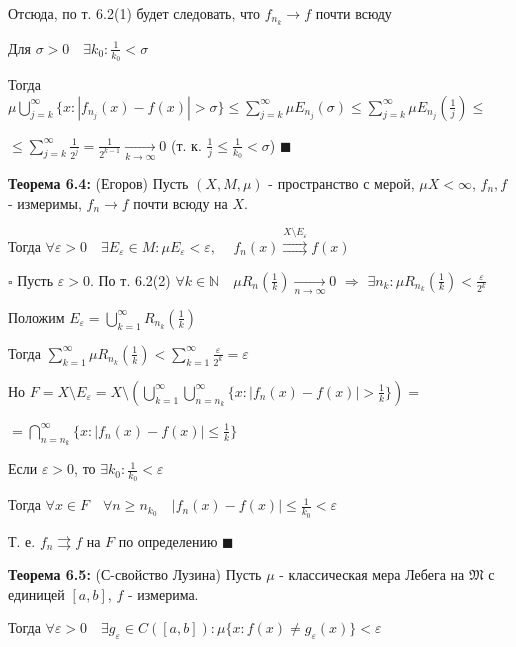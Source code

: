 \documentclass[a4paper]{report}
\begin{document}
Отсюда, по т. 6.2(1) будет следовать, что $f_{n_k}\to f$ почти всюду

Для $\sigma>0\quad\exists k_0\colon\displaystyle\frac{1}{k_0}<\sigma$

Тогда $\mu\bigcup\limits_{j=k}^\infty\{x\colon|f_{n_j}(x)-f(x)|>\sigma\}\le\sum\limits_{j=k}^\infty\mu E_{n_j}(\sigma)\le\sum\limits_{j=k}^\infty\mu E_{n_j}
(\frac1j)\le$

$\le\sum\limits_{j=k}^\infty\displaystyle\frac{1}{2^j}=\displaystyle\frac{1}{2^{k-1}}\xrightarrow[k\to\infty]{}0$ (т. к. $\displaystyle\frac1j\le \displaystyle\frac{1}{k_0}<\sigma$) $\blacksquare$
\bigskip

\noindent\textbf{Теорема 6.4:} (Егоров) Пусть $(X,M,\mu)$ - пространство с мерой, $\mu X<\infty$, $f_n,f$ - измеримы, $f_n\to f$ почти всюду на $X$.

Тогда $\forall\varepsilon>0\quad\exists E_\varepsilon\in M\colon\mu E_\varepsilon<\varepsilon$, $\quad f_n(x)\stackrel{X\setminus E_\varepsilon}{\rightrightarrows}f(x)$

\noindent $\square$ Пусть $\varepsilon>0$. По т. 6.2(2) $\forall k\in\mathbb N\quad\mu R_n(\frac1k)\xrightarrow[n\to\infty]{}0$ $\Rightarrow$ $\exists n_k\colon
\mu R_{n_k}(\frac1k)<\displaystyle\frac{\varepsilon}{2^k}$

Положим $E_\varepsilon=\bigcup\limits_{k=1}^\infty R_{n_k}(\frac1k)$

Тогда $\sum\limits_{k=1}^\infty\mu R_{n_k}(\frac1k)<\sum\limits_{k=1}^\infty\displaystyle\frac{\varepsilon}{2^k}=\varepsilon$

Но $F=X\setminus E_\varepsilon=X\setminus\left(\bigcup\limits_{k=1}^\infty\bigcup\limits_{n=n_k}^\infty\{x\colon|f_n(x)-f(x)|>\frac1k\}\right)=$

$=\bigcap\limits_{n=n_k}^\infty\{x\colon|f_n(x)-f(x)|\le\frac1k\}$

Если $\varepsilon>0$, то $\exists k_0\colon\displaystyle\frac{1}{k_0}<\varepsilon$

Тогда $\forall x\in F\quad\forall n\ge n_{k_0}\quad|f_n(x)-f(x)|\le\displaystyle\frac{1}{k_0}<\varepsilon$

Т. е. $f_n\rightrightarrows f$ на $F$ по определению $\blacksquare$
\bigskip

\noindent\textbf{Теорема 6.5:} (С-свойство Лузина) Пусть $\mu$ - классическая мера Лебега на $\mathfrak M$ с единицей $[a,b]$, $f$ - измерима.

Тогда $\forall\varepsilon>0\quad\exists g_\varepsilon\in C([a,b])\colon\mu\{x\colon f(x)\ne g_\varepsilon(x)\}<\varepsilon$
\end{document}
